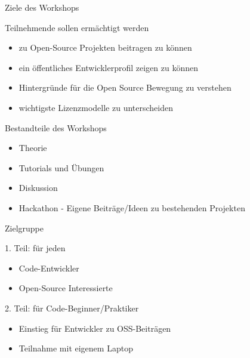 \documentclass[compress,aspectratio=169]{beamer}
\begin{document}
\begin{frame}{Ziele des Workshops}
  \begin{block}{Teilnehmende sollen ermächtigt werden}
  \begin{itemize}
    \item zu Open-Source Projekten beitragen zu können
    \item ein öffentliches Entwicklerprofil zeigen zu können
    \item Hintergründe für die Open Source Bewegung zu verstehen
    \item wichtigste Lizenzmodelle zu unterscheiden
  \end{itemize}
  \end{block}

  \begin{block}{Bestandteile des Workshops}
    \begin{itemize}
      \item Theorie
      \item Tutorials und Übungen
      \item Diskussion
      \item Hackathon - Eigene Beiträge/Ideen zu bestehenden Projekten
    \end{itemize}
  \end{block}
\end{frame}


\begin{frame}{Zielgruppe}
  
  \begin{block}{1. Teil: für jeden}
    \begin{itemize}
      \item Code-Entwickler
      \item Open-Source Interessierte
    \end{itemize}
    \end{block}

  \begin{block}{2. Teil: für Code-Beginner/Praktiker}
  \begin{itemize}
    \item Einstieg für Entwickler zu OSS-Beiträgen
    \item Teilnahme mit eigenem Laptop
  \end{itemize}
  \end{block}
\end{frame}
\end{document}
